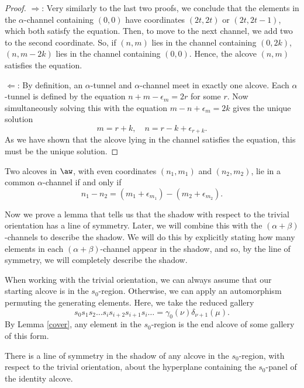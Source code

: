 \documentclass[11pt]{article}
\begin{document}
\begin{proof}
    $\Rightarrow$: Very similarly to the last two proofs, we conclude that the elements in the $\alpha$-channel containing $(0,0)$ have coordinates $(2t,2t)$ or $(2t,2t-1)$, which both satisfy the equation. Then, to move to the next channel, we add two to the second coordinate. So, if $(n,m)$ lies in the channel containing $(0,2k)$, $(n,m-2k)$ lies in the channel containing $(0,0)$. Hence, the alcove $(n,m)$ satisfies the equation. 

    $\Leftarrow$: By definition, an $\alpha$-tunnel and $\alpha$-channel meet in exactly one alcove. Each $\alpha$-tunnel is defined by the equation $n+m-\epsilon_m=2r$ for some $r$. Now simultaneously solving this with the equation $m-n+\epsilon_m=2k$ gives the unique solution
    \[m=r+k, \quad n=r-k+\epsilon_{r+k}.\]
    As we have shown that the alcove lying in the channel satisfies the equation, this must be the unique solution. 
\end{proof}
    
\begin{corollary}
    Two alcoves in $\aw$, with even coordinates $(n_1,m_1)$ and $(n_2,m_2)$, lie in a common $\alpha$-channel if and only if
    \[n_1-n_2=(m_1+\epsilon_{m_1})-(m_2+\epsilon_{m_2}).\]
\end{corollary}








Now we prove a lemma that tells us that the shadow with respect to the trivial orientation has a line of symmetry. Later, we will combine this with the $(\alpha+\beta)$-channels to describe the shadow. We will do this by explicitly stating how many elements in each $(\alpha+\beta)$-channel appear in the shadow, and so, by the line of symmetry, we will completely describe the shadow.

When working with the trivial orientation, we can always assume that our starting alcove is in the $s_0$-region. Otherwise, we can apply an automorphism permuting the generating elements. Here, we take the reduced gallery  \[s_0s_1s_2\hdots s_is_{i+2}s_{i+1}s_i\hdots=\gamma_0(\nu)\delta_{\nu+1}(\mu).\]
By Lemma \ref{cover}, any element in the $s_0$-region is the end alcove of some gallery of this form. 




\begin{lemma}\label{symmetry}
    There is a line of symmetry in the shadow of any alcove in the $s_0$-region, with respect to the trivial orientation, about the hyperplane containing the $s_0$-panel of the identity alcove.
\end{lemma}
\end{document}
